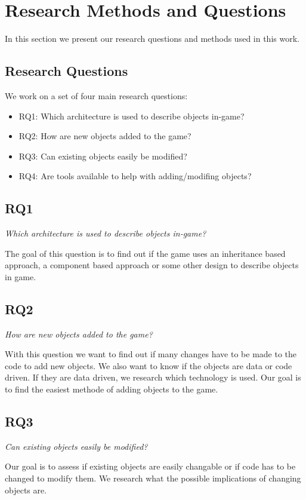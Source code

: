 \section{Research Methods and Questions}
In this section we present our research questions and methods used in this work. 

\subsection{Research Questions}
We work on a set of four main research questions:
\begin{itemize}
	\item RQ1: Which architecture is used to describe objects in-game?
	\item RQ2: How are new objects added to the game?
	\item RQ3: Can existing objects easily be modified?
	\item RQ4: Are tools available to help with adding/modifing objects?
\end{itemize}

\subsection{RQ1}
\textit{Which architecture is used to describe objects in-game?}

The goal of this question is to find out if the game uses an inheritance based approach, a component based approach or
some other design to describe objects in game. 

\subsection{RQ2}
\textit{How are new objects added to the game?}

With this question we want to find out if many changes have to be made to the code to add new objects. We also want
to know if the objects are data or code driven. If they are data driven, we research which technology is used. Our goal
is to find the easiest methode of adding objects to the game.

\subsection{RQ3}
\textit{Can existing objects easily be modified?}

Our goal is to assess if existing objects are easily changable or if code has to be changed to modify them. We
research what the possible implications of changing objects are.

